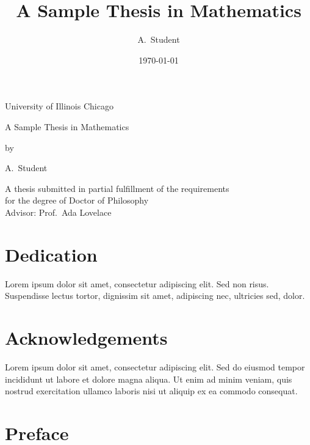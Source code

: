\documentclass[12pt,reqno,oneside]{amsbook}
\theoremstyle{definition}
\begin{document}
\newcommand{\thetitle}{A Sample Thesis in Mathematics}
\title{\thetitle}
\date{\today}
\newcommand{\institution}{University of Illinois Chicago} 
\newcommand{\degree}{Doctor of Philosophy}
\newcommand{\advisor}{Prof.~Ada Lovelace}
\newcommand{\theauthor}{A.~Student}
\author{\theauthor}

\frontmatter

\begin{titlepage}
    \centering
    {\Large \institution\par}
    \vspace{2cm}
    {\Large \thetitle \par}
    \vspace{2cm}
    {\Large by\par}
    \vspace{0.5cm}
    {\Large \theauthor\par}
    \vfill
    A thesis submitted in partial fulfillment of the requirements \\
    for the degree of  \degree \\
    \vspace{0.5cm}
    Advisor: \advisor \\
    \vspace{1cm}
    \makeatletter\@date \makeatother
\end{titlepage}


\chapter*{Dedication}

Lorem ipsum dolor sit amet, consectetur adipiscing elit. Sed non risus. Suspendisse lectus tortor, dignissim sit amet, adipiscing nec, ultricies sed, dolor.

\chapter*{Acknowledgements}

Lorem ipsum dolor sit amet, consectetur adipiscing elit. Sed do eiusmod tempor incididunt ut labore et dolore magna aliqua. Ut enim ad minim veniam, quis nostrud exercitation ullamco laboris nisi ut aliquip ex ea commodo consequat.

\chapter*{Preface}
\end{document}
